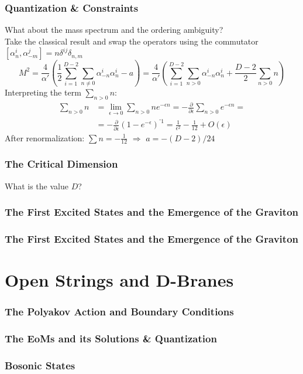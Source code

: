 \documentclass[aspectratio=169]{beamer}
\begin{document}
	\begin{frame}
		\frametitle{Quantization \& Constraints}
		What about the mass spectrum and the ordering ambiguity?\\
		Take the classical result and swap the operators using the commutator 			$\left[\alpha^i_n,\alpha^j_{-m}\right]= n\delta^{ij}\delta_{n,m}$
		\begin{equation*}
			M^2 = \frac{4}{\alpha'} \left(\frac{1}{2}\sum_{i=1}^{D-2}\sum_{n\neq 0}^{}\alpha^i_{-n}\alpha^i_n -a \right) = \frac{4}{\alpha'} \left(\sum_{i=1}^{D-2}\sum_{n>0}\alpha^i_{-n}\alpha^i_n+\frac{D-2}{2}\sum_{n>0}n\right)
		\end{equation*}
		Interpreting the term $\sum_{n>0}n$:
		\begin{align*}
			\sum_{n>0}n &= \lim_{\epsilon\rightarrow 0} \sum_{n>0}ne^{-\epsilon n} = -\frac{\partial}{\partial\epsilon}\sum_{n>0}e^{-\epsilon n} = \\
			& = -\frac{\partial}{\partial\epsilon} (1-e^{-\epsilon})^{⁻1} = \frac{1}{\epsilon^2}-\frac{1}{12}+O(\epsilon)
		\end{align*}
		After renormalization: $\sum n = -\frac{1}{12}$ \quad $\Rightarrow$ \quad $a=-(D-2)/24$
	\end{frame}

	\begin{frame}
		\frametitle{The Critical Dimension}
		What is the value $D$?
	\end{frame}


	\begin{frame}
		\frametitle{The First Excited States and the Emergence of the Graviton}
	\end{frame}

	\begin{frame}
		\frametitle{The First Excited States and the Emergence of the Graviton}
	\end{frame}

	\section{Open Strings and D-Branes}
	
	\begin{frame}
		\frametitle{The Polyakov Action and Boundary Conditions}
	\end{frame}

	\begin{frame}
		\frametitle{The EoMs and its Solutions \& Quantization}
	\end{frame}

	\begin{frame}
		\frametitle{Bosonic States}
	\end{frame}

\end{document}
